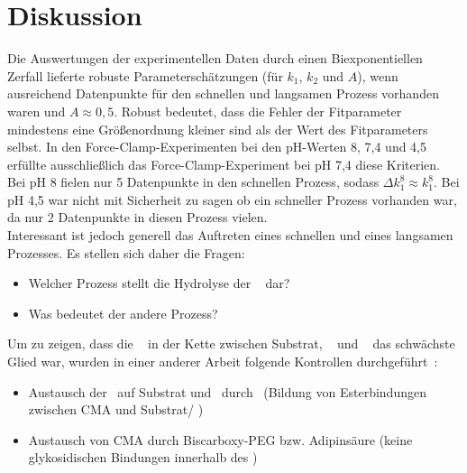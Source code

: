 \chapter{Diskussion}
\label{kap:diskussion}

Die Auswertungen der experimentellen Daten durch einen Biexponentiellen Zerfall lieferte robuste Parameterschätzungen (für $k_1$, $k_2$ und $A$), wenn ausreichend Datenpunkte für den schnellen und langsamen Prozess vorhanden waren und $A \approx 0,5$. Robust bedeutet, dass die Fehler der Fitparameter mindestens eine Größenordnung kleiner sind als der Wert des Fitparameters selbst. In den Force-Clamp-Experimenten bei den pH-Werten 8, 7,4 und 4,5 erfüllte ausschließlich das Force-Clamp-Experiment bei pH 7,4 diese Kriterien. Bei pH 8 fielen nur 5 Datenpunkte in den schnellen Prozess, sodass $\Delta k_1^{8}  \approx k_1^{8}$. Bei pH 4,5 war nicht mit Sicherheit zu sagen ob ein schneller Prozess vorhanden war, da nur 2 Datenpunkte in diesen Prozess vielen.\\
Interessant ist jedoch generell das Auftreten eines schnellen und eines langsamen Prozesses. Es stellen sich daher die Fragen:

\begin{itemize}
	\item Welcher Prozess stellt die Hydrolyse der \amid~ dar?
	\item Was bedeutet der andere Prozess?
\end{itemize}

Um zu zeigen, dass die \amid~ in der Kette zwischen Substrat, \spacer~ und \spitze~ das schwächste Glied war, wurden in einer anderer Arbeit folgende Kontrollen durchgeführt~\cite{ClausenSchaumann.2018}:

\begin{itemize}
	\item Austausch der \aminos~auf Substrat und \spitze~durch \carboxys~(Bildung von Esterbindungen zwischen \ac{CMA} und Substrat/ \spitze)
	\item Austausch von \ac{CMA} durch Biscarboxy-PEG bzw. Adipinsäure (keine glykosidischen Bindungen innerhalb des \spacers)
\end{itemize}

\renewcommand{\noteOne}{Die Dissoziationsenergie der O-O-Bindung liegt bei $142~kJ~mol^{-1}$. Verglichen mit einer C-C-Bindung mit $339~kJ~mol^{-1}$ oder C-O-Bindung mit $331~kJ~mol^{-1}$ um mehr als die Hälfte schwächer \cite[15]{Latscha.2016}}


